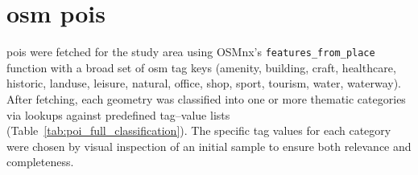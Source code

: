 \section[OSM POIs]{\acs{osm} \acp{poi}}
  \label{app_paper1:pois}
  \setcounter{figure}{0}
  \setcounter{table}{0}
  \renewcommand{\thefigure}{A.3.\arabic{figure}}
  \renewcommand{\thetable}{A.3.\arabic{table}}

  \acp{poi} were fetched for the study area using OSMnx's \texttt{features\_from\_place} function with a broad set of \acs{osm} tag keys (amenity, building, craft, healthcare, historic, landuse, leisure, natural, office, shop, sport, tourism, water, waterway). After fetching, each geometry was classified into one or more thematic categories via lookups against predefined tag–value lists (Table~\ref{tab:poi_full_classification}). The specific tag values for each category were chosen by visual inspection of an initial sample to ensure both relevance and completeness.

